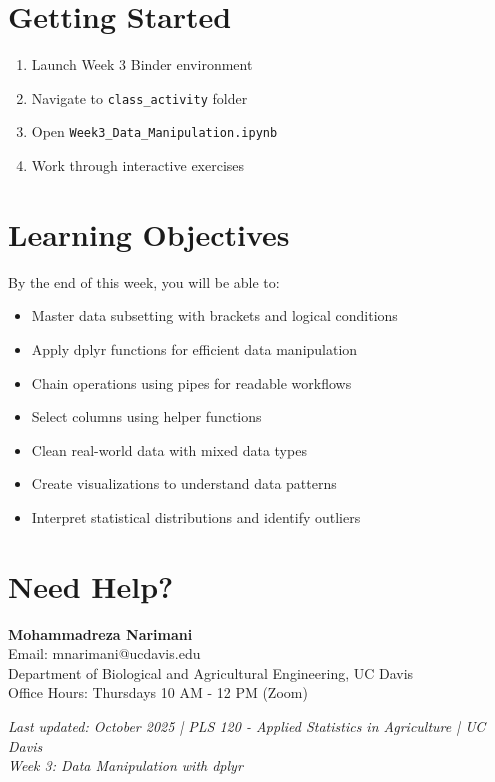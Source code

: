\documentclass[11pt,a4paper]{article}
\begin{document}
\section{Getting Started}

\begin{enumerate}
    \item Launch Week 3 Binder environment
    \item Navigate to \texttt{class\_activity} folder
    \item Open \texttt{Week3\_Data\_Manipulation.ipynb}
    \item Work through interactive exercises
\end{enumerate}

\section{Learning Objectives}

By the end of this week, you will be able to:
\begin{itemize}
    \item Master data subsetting with brackets and logical conditions
    \item Apply dplyr functions for efficient data manipulation
    \item Chain operations using pipes for readable workflows
    \item Select columns using helper functions
    \item Clean real-world data with mixed data types
    \item Create visualizations to understand data patterns
    \item Interpret statistical distributions and identify outliers
\end{itemize}

\section{Need Help?}

\begin{infobox}
\textbf{Mohammadreza Narimani}\\
Email: mnarimani@ucdavis.edu\\
Department of Biological and Agricultural Engineering, UC Davis\\
Office Hours: Thursdays 10 AM - 12 PM (Zoom)
\end{infobox}

\vfill

\begin{center}
\textit{Last updated: October 2025 | PLS 120 - Applied Statistics in Agriculture | UC Davis}\\
\textit{Week 3: Data Manipulation with dplyr}
\end{center}
\end{document}
